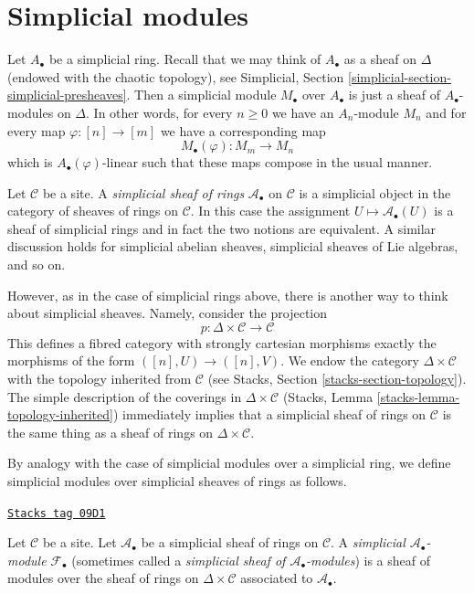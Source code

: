 \section{Simplicial modules}
\label{sites-cohomology-section-simplicial-modules}
Let $A_\bullet$ be a simplicial ring. Recall that we may think of $A_\bullet$
as a sheaf on $\Delta$ (endowed with the chaotic topology), see
Simplicial, Section \ref{simplicial-section-simplicial-presheaves}.
Then a simplicial module $M_\bullet$ over $A_\bullet$ is just a sheaf of
$A_\bullet$-modules on $\Delta$. In other words, for every $n \geq 0$ we have
an $A_n$-module $M_n$ and for every map $\varphi : [n] \to [m]$ we have
a corresponding map
$$
M_\bullet(\varphi) : M_m \longrightarrow M_n
$$
which is $A_\bullet(\varphi)$-linear such that these maps compose in the
usual manner.

\medskip\noindent
Let $\mathcal{C}$ be a site. A {\it simplicial sheaf of rings}
$\mathcal{A}_\bullet$ on $\mathcal{C}$
is a simplicial object in the category of sheaves of rings on $\mathcal{C}$.
In this case the assignment $U \mapsto \mathcal{A}_\bullet(U)$ is a sheaf
of simplicial rings and in fact the two notions are equivalent.
A similar discussion holds for simplicial abelian sheaves, simplicial
sheaves of Lie algebras, and so on.

\medskip\noindent
However, as in the case of simplicial rings above, there is another way
to think about simplicial sheaves. Namely, consider the projection
$$
p : \Delta \times \mathcal{C} \longrightarrow \mathcal{C}
$$
This defines a fibred category with strongly cartesian morphisms
exactly the morphisms of the form $([n], U) \to ([n], V)$. We endow the category
$\Delta \times \mathcal{C}$ with the topology inherited from $\mathcal{C}$
(see Stacks, Section \ref{stacks-section-topology}). The simple description
of the coverings in $\Delta \times \mathcal{C}$
(Stacks, Lemma \ref{stacks-lemma-topology-inherited}) immediately
implies that a simplicial sheaf of rings on $\mathcal{C}$ is the
same thing as a sheaf of rings on $\Delta \times \mathcal{C}$.

\medskip\noindent
By analogy with the case of simplicial modules over a simplicial
ring, we define simplicial modules over simplicial sheaves of rings
as follows.

\begin{definition}
\label{sites-cohomology-definition-simplicial-module}
\href{https://stacks.math.columbia.edu/tag/09D1}{\texttt{Stacks tag 09D1}}

Let $\mathcal{C}$ be a site. Let $\mathcal{A}_\bullet$ be a simplicial
sheaf of rings on $\mathcal{C}$. A
{\it simplicial $\mathcal{A}_\bullet$-module} $\mathcal{F}_\bullet$
(sometimes called a
{\it simplicial sheaf of $\mathcal{A}_\bullet$-modules})
is a sheaf of modules over the sheaf of rings on $\Delta \times \mathcal{C}$
associated to $\mathcal{A}_\bullet$.
\end{definition}

